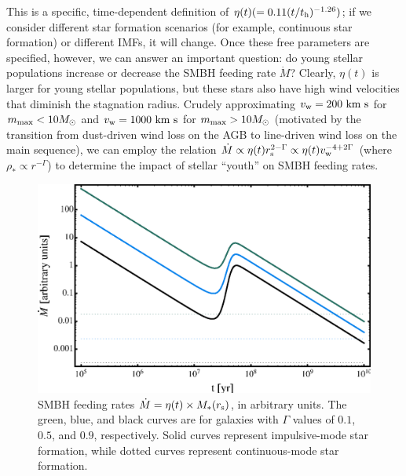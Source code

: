 \documentclass[usenatbib,fleqn]{mn2e}
\begin{document}
This is a specific, time-dependent definition of $\eta(t) (=0.11(t/t_{\rm h})^{-1.26})$; if we consider different star formation scenarios (for example, continuous star formation) or different IMFs, it will change.  Once these free parameters are specified, however, we can answer an important question: do young stellar populations increase or decrease the SMBH feeding rate $\dot{M}$?  Clearly, $\eta(t)$ is larger for young stellar populations, but these stars also have high wind velocities that diminish the stagnation radius.  Crudely approximating $v_{\rm w}=200~{\rm km~s}$ for $m_{\rm max} < 10M_{\odot}$ and $v_{\rm w}=1000~{\rm km~s}$ for $m_{\rm max} > 10M_{\odot}$ (motivated by the transition from dust-driven wind loss on the AGB to line-driven wind loss on the main sequence), we can employ the relation $\dot{M} \propto \eta(t) r_{\rm s}^{2-\Gamma}\propto \eta(t) v_{\rm w}^{-4+2\Gamma}$ (where $\rho_* \propto r^{-\Gamma}$) to determine the impact of stellar ``youth'' on SMBH feeding rates.

\begin{figure}
\includegraphics[width=\columnwidth]{NickPlot.eps}
\caption{\label{NickPlot} SMBH feeding rates $\dot{M}=\eta(t) \times M_*(r_{\rm s})$, in arbitrary units.  The green, blue, and black curves are for galaxies with $\Gamma$ values of $0.1$, $0.5$, and $0.9$, respectively.  Solid curves represent impulsive-mode star formation, while dotted curves represent continuous-mode star formation.}
\end{figure}
\end{document}
